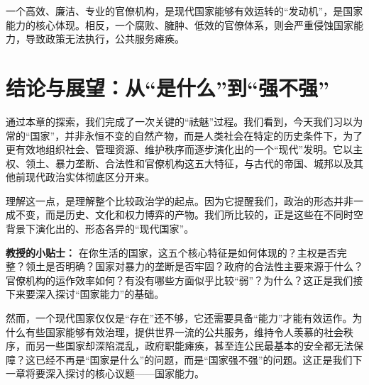一个高效、廉洁、专业的官僚机构，是现代国家能够有效运转的“发动机”，是国家能力的核心体现。相反，一个腐败、臃肿、低效的官僚体系，则会严重侵蚀国家能力，导致政策无法执行，公共服务瘫痪。

\hrulefill

\section{结论与展望：从“是什么”到“强不强”}

通过本章的探索，我们完成了一次关键的“祛魅”过程。我们看到，今天我们习以为常的“国家”，并非永恒不变的自然产物，而是人类社会在特定的历史条件下，为了更有效地组织社会、管理资源、维护秩序而逐步演化出的一个“现代”发明。它以主权、领土、暴力垄断、合法性和官僚机构这五大特征，与古代的帝国、城邦以及其他前现代政治实体彻底区分开来。

理解这一点，是理解整个比较政治学的起点。因为它提醒我们，政治的形态并非一成不变，而是历史、文化和权力博弈的产物。我们所比较的，正是这些在不同时空背景下演化出的、形态各异的“现代国家”。

\textbf{教授的小贴士：}
在你生活的国家，这五个核心特征是如何体现的？主权是否完整？领土是否明确？国家对暴力的垄断是否牢固？政府的合法性主要来源于什么？官僚机构的运作效率如何？有没有哪些方面似乎比较“弱”？为什么？这正是我们接下来要深入探讨“国家能力”的基础。

然而，一个现代国家仅仅是“存在”还不够，它还需要具备“能力”才能有效运作。为什么有些国家能够有效治理，提供世界一流的公共服务，维持令人羡慕的社会秩序，而另一些国家却深陷混乱，政府职能瘫痪，甚至连公民最基本的安全都无法保障？这已经不再是“国家是什么”的问题，而是“国家强不强”的问题。这正是我们下一章将要深入探讨的核心议题——国家能力。
